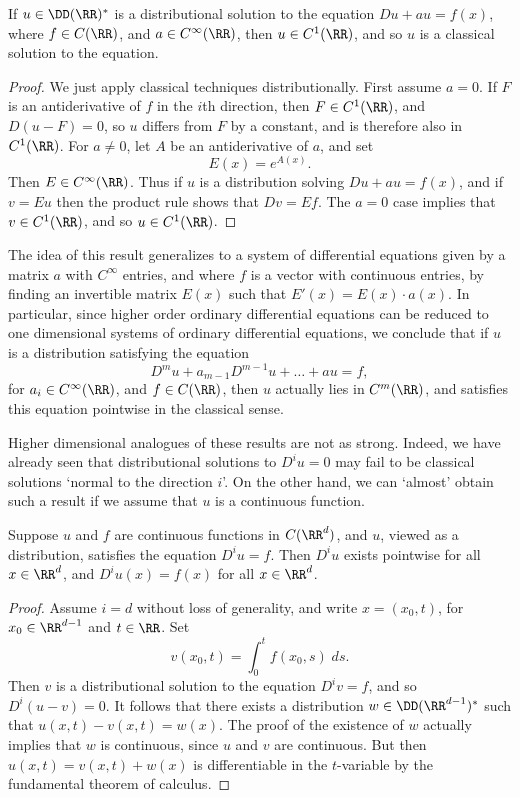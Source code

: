 \begin{lemma}
    If $u \in \DD(\RR)^*$ is a distributional solution to the equation $D u + a u = f(x)$, where $f \in C(\RR)$, and $a \in C^\infty(\RR)$, then $u \in C^1(\RR)$, and so $u$ is a classical solution to the equation.
\end{lemma}
\begin{proof}
    We just apply classical techniques distributionally. First assume $a = 0$. If $F$ is an antiderivative of $f$ in the $i$th direction, then $F \in C^1(\RR)$, and $D(u - F) = 0$, so $u$ differs from $F$ by a constant, and is therefore also in $C^1(\RR)$. For $a \neq 0$, let $A$ be an antiderivative of $a$, and set
    \[ E(x) = e^{A(x)}. \]
    Then $E \in C^\infty(\RR)$. Thus if $u$ is a distribution solving $D u + a u = f(x)$, and if $v = E u$ then the product rule shows that $Dv = Ef$. The $a = 0$ case implies that $v \in C^1(\RR)$, and so $u \in C^1(\RR)$.
\end{proof}

\begin{remark}
    The idea of this result generalizes to a system of differential equations given by a matrix $a$ with $C^\infty$ entries, and where $f$ is a vector with continuous entries, by finding an invertible matrix $E(x)$ such that $E'(x) = E(x) \cdot a(x)$. In particular, since higher order ordinary differential equations can be reduced to one dimensional systems of ordinary differential equations, we conclude that if $u$ is a distribution satisfying the equation
    \[ D^m u + a_{m-1} D^{m-1} u + \dots + au = f, \]
    for $a_i \in C^\infty(\RR)$, and $f \in C(\RR)$, then $u$ actually lies in $C^m(\RR)$, and satisfies this equation pointwise in the classical sense.
\end{remark}

Higher dimensional analogues of these results are not as strong. Indeed, we have already seen that distributional solutions to $D^i u = 0$ may fail to be classical solutions `normal to the direction $i$'. On the other hand, we can `almost' obtain such a result if we assume that $u$ is a continuous function.

\begin{lemma}
    Suppose $u$ and $f$ are continuous functions in $C(\RR^d)$, and $u$, viewed as a distribution, satisfies the equation $D^i u = f$. Then $D^i u$ exists pointwise for all $x \in \RR^d$, and $D^i u (x) = f(x)$ for all $x \in \RR^d$.
\end{lemma}
\begin{proof}
    Assume $i = d$ without loss of generality, and write $x = (x_0,t)$, for $x_0 \in \RR^{d-1}$ and $t \in \RR$. Set
    \[ v(x_0,t) = \int_0^t f(x_0,s)\; ds. \]
    Then $v$ is a distributional solution to the equation $D^i v = f$, and so $D^i(u - v) = 0$. It follows that there exists a distribution $w \in \DD(\RR^{d-1})^*$ such that $u(x,t) - v(x,t) = w(x)$. The proof of the existence of $w$ actually implies that $w$ is continuous, since $u$ and $v$ are continuous. But then $u(x,t) = v(x,t) + w(x)$ is differentiable in the $t$-variable by the fundamental theorem of calculus.
\end{proof}

